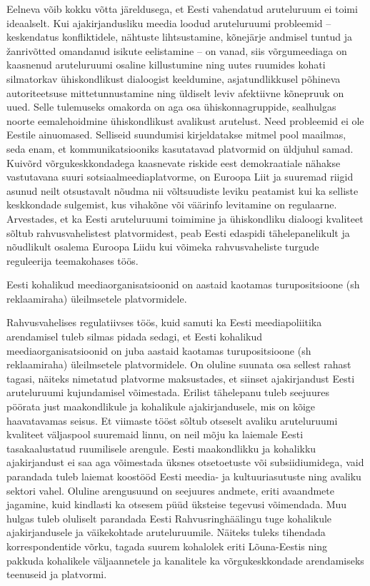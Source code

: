 \documentclass[estonian,]{article}
\begin{document}
Eelneva võib kokku võtta järeldusega, et Eesti vahendatud aruteluruum ei toimi ideaalselt. Kui ajakirjandusliku meedia loodud aruteluruumi probleemid -- keskendatus konfliktidele, nähtuste lihtsustamine, kõnejärje andmisel tuntud ja žanrivõtted omandanud isikute eelistamine -- on vanad, siis võrgumeediaga on kaasnenud aruteluruumi osaline killustumine ning uutes ruumides kohati silmatorkav ühiskondlikust dialoogist keeldumine, asjatundlikkusel põhineva autoriteetsuse mittetunnustamine ning üldiselt leviv afektiivne kõnepruuk on uued. Selle tulemuseks omakorda on aga osa ühiskonnagruppide, sealhulgas noorte eemalehoidmine ühiskondlikust avalikust arutelust. Need probleemid ei ole Eestile ainuomased. Selliseid suundumisi kirjeldatakse mitmel pool maailmas, seda enam, et kommunikatsiooniks kasutatavad platvormid on üldjuhul samad. Kuivõrd võrgukeskkondadega kaasnevate riskide eest demokraatiale nähakse vastutavana suuri sotsiaalmeediaplatvorme, on Euroopa Liit ja suuremad riigid asunud neilt otsustavalt nõudma nii võltsuudiste leviku peatamist kui ka selliste keskkondade sulgemist, kus vihakõne või väärinfo levitamine on regulaarne. Arvestades, et ka Eesti aruteluruumi toimimine ja ühiskondliku dialoogi kvaliteet sõltub rahvusvahelistest platvormidest, peab Eesti edaspidi tähelepanelikult ja nõudlikult osalema Euroopa Liidu kui võimeka rahvusvaheliste turgude reguleerija teemakohases töös.

\begin{blockquote-left}
Eesti kohalikud meediaorganisatsioonid on aastaid kaotamas
turupositsioone (sh reklaamiraha) üleilmsetele platvormidele.
\end{blockquote-left}

Rahvusvahelises regulatiivses töös, kuid samuti ka Eesti meediapoliitika arendamisel tuleb silmas pidada sedagi, et Eesti kohalikud meediaorganisatsioonid on juba aastaid kaotamas turupositsioone (sh reklaamiraha) üleilmsetele platvormidele. On oluline suunata osa sellest rahast tagasi, näiteks nimetatud platvorme maksustades, et siinset ajakirjandust Eesti aruteluruumi kujundamisel võimestada. Erilist tähelepanu tuleb seejuures pöörata just maakondlikule ja kohalikule ajakirjandusele, mis on kõige haavatavamas seisus. Et viimaste tööst sõltub otseselt avaliku aruteluruumi kvaliteet väljaspool suuremaid linnu, on neil mõju ka laiemale Eesti tasakaalustatud ruumilisele arengule. Eesti maakondlikku ja kohalikku ajakirjandust ei saa aga võimestada üksnes otsetoetuste või subsiidiumidega, vaid parandada tuleb laiemat koostööd Eesti meedia- ja kultuuriasutuste ning avaliku sektori vahel. Oluline arengusuund on seejuures andmete, eriti avaandmete jagamine, kuid kindlasti ka otsesem püüd üksteise tegevusi võimendada. Muu hulgas tuleb oluliselt parandada Eesti Rahvusringhäälingu tuge kohalikule ajakirjandusele ja väikekohtade aruteluruumile. Näiteks tuleks tihendada korrespondentide võrku, tagada suurem kohalolek eriti Lõuna-Eestis ning pakkuda kohalikele väljaannetele ja kanalitele ka võrgukeskkondade arendamiseks teenuseid ja platvormi.
\end{document}
